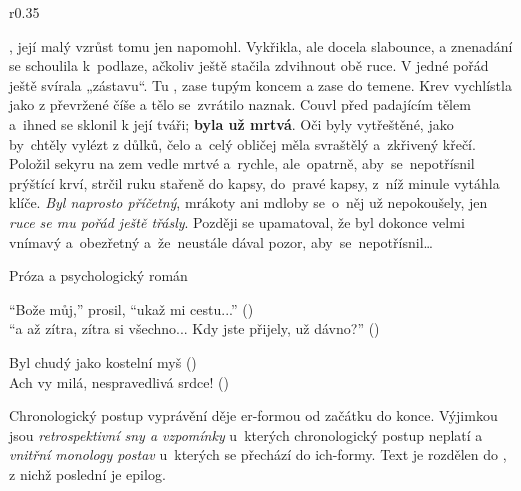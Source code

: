 \documentclass{extarticle} %
\begin{document}
\noindent\begin{wrapfigure}{r}{0.35\textwidth}
\tiny

\setlength{\parindent}{3pt}
, její malý vzrůst tomu jen napomohl.
Vykřikla, ale docela slabounce, a znenadání se schoulila k~podlaze,
ačkoliv ještě stačila zdvihnout obě ruce.
V jedné pořád ještě svírala „zástavu“.
Tu , zase tupým koncem a zase do temene.
Krev vychlístla jako z převržené číše a tělo se~zvrátilo naznak.
Couvl před padajícím tělem a~ihned se sklonil k její tváři; \textbf{byla už mrtvá}.
Oči byly vytřeštěné, jako by~chtěly vylézt z důlků,
čelo a~celý obličej měla svraštělý a~zkřivený křečí.\\
Položil sekyru na zem vedle mrtvé a~rychle, ale~opatrně,
aby~se~nepotřísnil prýštící krví, strčil ruku stařeně do kapsy,
do~pravé kapsy, z~níž minule vytáhla klíče.
\textit{Byl naprosto příčetný}, mrákoty ani mdloby se~o~něj už nepokoušely,
jen \textit{ruce se mu pořád ještě třásly}.
Později se upamatoval, že byl dokonce velmi vnímavý
a~obezřetný a~že~neustále dával pozor, aby~se~nepotřísnil…
\end{wrapfigure}


\noindent Próza a psychologický román



\noindent 
\enquote{Bože můj,} prosil, \enquote{ukaž mi cestu...} () \\
\enquote{a až zítra, zítra si všechno... Kdy jste přijely, už dávno?} ()

\noindent 
Byl chudý jako kostelní myš () \\
Ach vy milá, nespravedlivá srdce! ()

\noindent 
Chronologický postup vyprávění děje er-formou od začátku do konce.
Výjimkou jsou \textit{retrospektivní sny a vzpomínky} u~kterých chronologický postup neplatí a \textit{vnitřní monology postav} u~kterých se přechází do ich-formy.
Text je rozdělen do , z nichž poslední je epilog.
\end{document}
